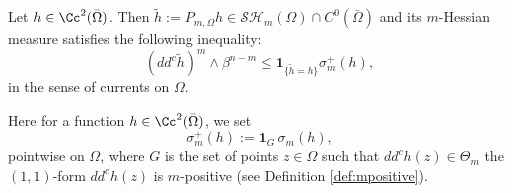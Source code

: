 
\begin{theorem} \label{thm:obstacle}
Let $h \in \Cc^2 ({\bar{\Omega}})$. Then $\tilde h:= P_{m,\Omega} h \in \mathcal{SH}_m (\Omega) \cap C^0 (\bar \Omega)$ and its $m$\nobreakdash-Hessian measure satisfies the following inequality:
\begin{equation} \label{eq:BerIneq1}
(dd^c \tilde h)^m \wedge \beta^{n - m} \leq \mathbf{1}_{\{ \tilde h = h\}} \sigma_m^+ (h),
\end{equation}
in the sense of currents on $\Omega$.
\end{theorem}
Here for a function $h \in \Cc^2 ({\bar{\Omega}})$, we set
\[
\sigma_m^+ (h):= \mathbf{1}_G \, \sigma_m (h),
\]
pointwise on $\Omega$, where $G$ is the set of points $z \in \Omega$ such that $dd^c h (z) \in \Theta_m$ \ie the $(1,1)$-form $dd^c h (z)$ is $m$-positive (see Definition \ref{def:mpositive}).

